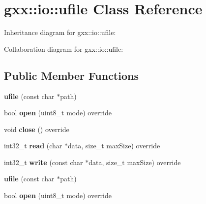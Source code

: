 \hypertarget{classgxx_1_1io_1_1ufile}{}\section{gxx\+:\+:io\+:\+:ufile Class Reference}
\label{classgxx_1_1io_1_1ufile}


Inheritance diagram for gxx\+:\+:io\+:\+:ufile\+:


Collaboration diagram for gxx\+:\+:io\+:\+:ufile\+:
\subsection*{Public Member Functions}
\begin{DoxyCompactItemize}
\item 
{\bfseries ufile} (const char $\ast$path)\hypertarget{classgxx_1_1io_1_1ufile_af08a1e19860c47c97e0425b48fc35dc8}{}\label{classgxx_1_1io_1_1ufile_af08a1e19860c47c97e0425b48fc35dc8}

\item 
bool {\bfseries open} (uint8\+\_\+t mode) override\hypertarget{classgxx_1_1io_1_1ufile_a273312c761c75e9665795025d5f9d1f0}{}\label{classgxx_1_1io_1_1ufile_a273312c761c75e9665795025d5f9d1f0}

\item 
void {\bfseries close} () override\hypertarget{classgxx_1_1io_1_1ufile_ae01e500b6b16373a70e8cdc6102eead4}{}\label{classgxx_1_1io_1_1ufile_ae01e500b6b16373a70e8cdc6102eead4}

\item 
int32\+\_\+t {\bfseries read} (char $\ast$data, size\+\_\+t max\+Size) override\hypertarget{classgxx_1_1io_1_1ufile_a53a4ca3f253bfba44d377b4795393662}{}\label{classgxx_1_1io_1_1ufile_a53a4ca3f253bfba44d377b4795393662}

\item 
int32\+\_\+t {\bfseries write} (const char $\ast$data, size\+\_\+t max\+Size) override\hypertarget{classgxx_1_1io_1_1ufile_a02d3f46d78315ac5ab275a97c36221af}{}\label{classgxx_1_1io_1_1ufile_a02d3f46d78315ac5ab275a97c36221af}

\item 
{\bfseries ufile} (const char $\ast$path)\hypertarget{classgxx_1_1io_1_1ufile_af08a1e19860c47c97e0425b48fc35dc8}{}\label{classgxx_1_1io_1_1ufile_af08a1e19860c47c97e0425b48fc35dc8}

\item 
bool {\bfseries open} (uint8\+\_\+t mode) override\hypertarget{classgxx_1_1io_1_1ufile_a273312c761c75e9665795025d5f9d1f0}{}\label{classgxx_1_1io_1_1ufile_a273312c761c75e9665795025d5f9d1f0}


\end{DoxyCompactItemize}
